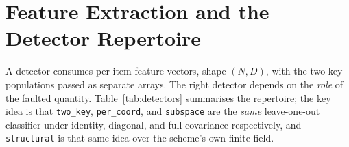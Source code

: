 \documentclass[11pt]{article}
\newcommand{\code}[1]{\texttt{#1}}
\begin{document}
\section{Feature Extraction and the Detector Repertoire}\label{sec:detectors}

A detector consumes per-item feature vectors, shape $(N,D)$, with the two key
populations passed as separate arrays. The right detector depends on the
\emph{role} of the faulted quantity. Table~\ref{tab:detectors} summarises the
repertoire; the key idea is that \code{two\_key}, \code{per\_coord}, and
\code{subspace} are the \emph{same} leave-one-out classifier under identity,
diagonal, and full covariance respectively, and \code{structural} is that same idea
over the scheme's own finite field.
\end{document}

